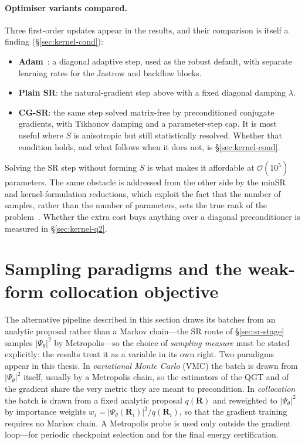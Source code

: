 \paragraph{Optimiser variants compared.}
Three first-order updates appear in the results, and their comparison is itself a finding
(\S\ref{sec:kernel-cond}):
\begin{itemize}
  \item \textbf{Adam}~\cite{KingmaBa2015-Adam}: a diagonal adaptive step, used as the
    robust default, with separate learning rates for the Jastrow and backflow blocks.
  \item \textbf{Plain SR}: the natural-gradient step above with a fixed diagonal damping
    $\lambda$.
  \item \textbf{CG-SR}: the same step solved matrix-free by preconditioned conjugate
    gradients, with Tikhonov damping and a parameter-step cap. It is most useful where $S$ is
    anisotropic but still statistically resolved. Whether that condition holds, and what
    follows when it does not, is \S\ref{sec:kernel-cond}.
\end{itemize}
Solving the SR step without forming $S$ is what makes it affordable at
$\mathcal{O}(10^5)$ parameters. The same obstacle is addressed from the other side by the
minSR and kernel-formulation reductions, which exploit the fact that the number of samples,
rather than the number of parameters, sets the true rank of the
problem~\cite{ChenHeyl2024-minSR,Rende2024-KernelSR}. Whether the extra cost buys anything
over a diagonal preconditioner is measured in \S\ref{sec:kernel-q2}.

\section{Sampling paradigms and the weak-form collocation objective}
\label{sec:method-collocation}
The alternative pipeline described in this section draws its batches from an analytic
proposal rather than a Markov chain---the SR route of \S\ref{sec:sr-stage} samples
$|\Psi_\theta|^2$ by Metropolis---so the choice of \emph{sampling measure} must be stated
explicitly: the results treat it as a variable in its own right. Two paradigms appear in this
thesis. In \emph{variational Monte Carlo} (VMC) the batch is drawn from
$|\Psi_\theta|^2$ itself, usually by a Metropolis chain, so the estimators of the QGT
and of the gradient share the very metric they are meant to precondition. In
\emph{collocation} the batch is drawn from a fixed analytic proposal $q(\mathbf R)$ and
reweighted to $|\Psi_\theta|^2$ by importance weights
$w_i=|\Psi_\theta(\mathbf R_i)|^2/q(\mathbf R_i)$, so that the gradient training requires no
Markov chain. A Metropolis probe is used only outside the gradient loop---for periodic
checkpoint selection and for the final energy certification.

